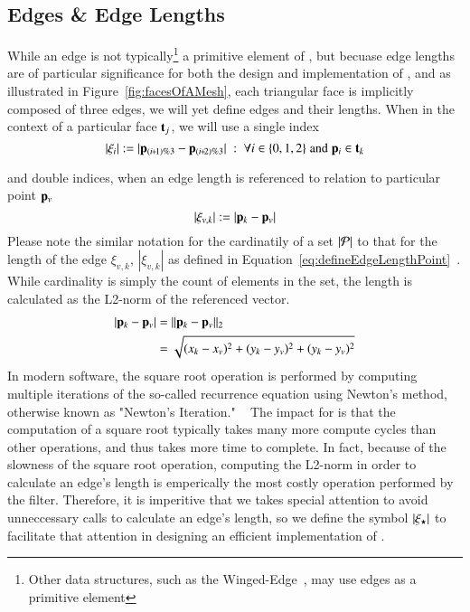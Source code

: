\subsection{Edges \& Edge Lengths}
\label{chBsEEL}
While an edge is not typically\footnote{Other data structures, such as the Winged-Edge~\cite[p.~1]{Baumgart75}, may use edges as a primitive element} a primitive element of \tdd{}, but becuase edge lengths are of particular significance for both the design and implementation of , and as illustrated in Figure~\ref{fig:facesOfAMesh}, each triangular face is implicitly composed of three edges, we will yet define edges and their lengths. When in the context of a particular face $\mathbf{t}_j$, we will use a single index
\begin{equation}
	|\xi_i| := |\bp_{(\sipo)\%3} - \bp_{(\sipt)\%3}| \;:\; \forall i \in\{0,1,2\} \;\text{and}\; \bp_i \in \bt_k
	\label{eq:defineEdgeLengthFace}
\end{equation}%

and double indices, when an edge length is referenced to relation to particular point $\mathbf{p}_v$
\begin{equation}
	|\xi_{v,k}| := |\mathbf{p}_k - \mathbf{p}_v|
	\label{eq:defineEdgeLengthPoint}
\end{equation}%
%
Please note the similar notation for the cardinatily of a set $|\mathcal{P}|$ to that for the length of the edge $\xi_{v,k}$, $|\xi_{v,k}|$ as defined in Equation~\ref{eq:defineEdgeLengthPoint}~\cite[p.~26]{Mara12}. While cardinality is simply the count of elements in the set, the length is calculated as the L2-norm of the referenced vector.
\begin{align}
	|\mathbf{p}_k - \mathbf{p}_v| & = \lVert\mathbf{p}_k - \mathbf{p}_v\rVert_2 \\
					& = \sqrt{(x_k-x_v)^2 + (y_k-y_v)^2 + (y_k-y_v)^2}
	\label{eq:defineEdgeLengthCalc}
\end{align}
%
In modern software, the square root operation is performed by computing multiple iterations of the so-called recurrence equation using Newton's method, otherwise known as "Newton's Iteration." ~\cite{Weisstein19b} The impact for  is that the computation of a square root typically takes many more compute cycles than other operations, and thus takes more time to complete. In fact, because of the slowness of the square root operation, computing the L2-norm in order to calculate an edge's length is emperically the most costly operation performed by the filter.  Therefore, it is imperitive that we takes special attention to avoid unneccessary calls to calculate an edge's length, so we define the symbol $\left |\xi_\star \right |$ to facilitate that attention in designing an efficient implementation of .
%

